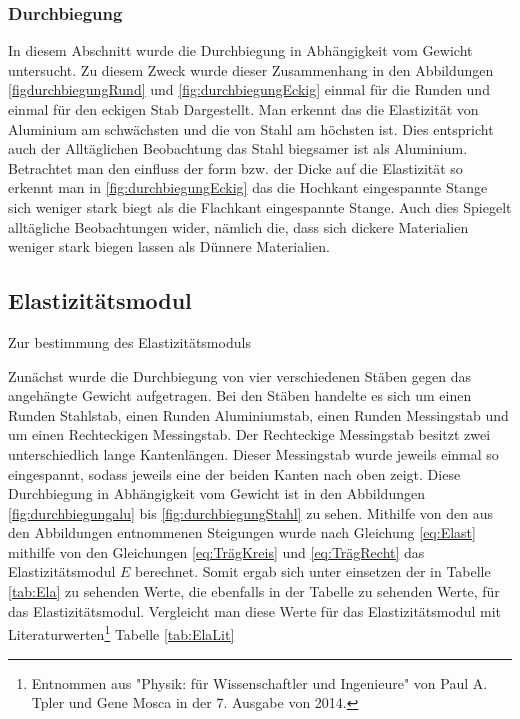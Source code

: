 \subsubsection*{Durchbiegung}
In diesem Abschnitt wurde die Durchbiegung in Abhängigkeit vom Gewicht untersucht. Zu diesem Zweck wurde dieser Zusammenhang in den Abbildungen \ref{figdurchbiegungRund} und \ref{fig:durchbiegungEckig} einmal für die Runden und einmal für den eckigen Stab Dargestellt.
Man erkennt das die Elastizität von Aluminium am schwächsten und die von Stahl am höchsten ist. Dies entspricht auch der Alltäglichen Beobachtung das Stahl biegsamer ist als Aluminium.
Betrachtet man den einfluss der form bzw. der Dicke auf die Elastizität so erkennt man in \ref{fig:durchbiegungEckig} das die Hochkant eingespannte Stange sich weniger stark biegt als die Flachkant eingespannte Stange. Auch dies Spiegelt alltägliche Beobachtungen wider, nämlich die, dass sich dickere Materialien weniger stark biegen lassen als Dünnere Materialien.

\subsection{Elastizitätsmodul}

Zur bestimmung des Elastizitätsmoduls

Zunächst wurde die Durchbiegung von vier verschiedenen Stäben gegen das angehängte Gewicht aufgetragen.
Bei den Stäben handelte es sich um einen Runden Stahlstab, einen Runden Aluminiumstab, einen Runden Messingstab und um einen Rechteckigen Messingstab.
Der Rechteckige Messingstab besitzt zwei unterschiedlich lange Kantenlängen. Dieser Messingstab wurde jeweils einmal so eingespannt, sodass jeweils eine der beiden Kanten nach oben zeigt.
Diese Durchbiegung in Abhängigkeit vom Gewicht ist in den Abbildungen \ref{fig:durchbiegungalu} bis \ref{fig:durchbiegungStahl} zu sehen. 
Mithilfe von den aus den Abbildungen entnommenen Steigungen wurde nach Gleichung \ref{eq:Elast} mithilfe von den Gleichungen \ref{eq:TrägKreis} und \ref{eq:TrägRecht} das Elastizitätsmodul $E$ berechnet.
Somit ergab sich unter einsetzen der in Tabelle \ref{tab:Ela} zu sehenden Werte, die ebenfalls in der Tabelle zu sehenden Werte, für das Elastizitätsmodul. 
Vergleicht man diese Werte für das Elastizitätsmodul mit Literaturwerten\footnote{Entnommen aus "Physik: für Wissenschaftler und Ingenieure" von Paul A. Tpler und Gene Mosca in der 7. Ausgabe von 2014.} Tabelle \ref{tab:ElaLit}

